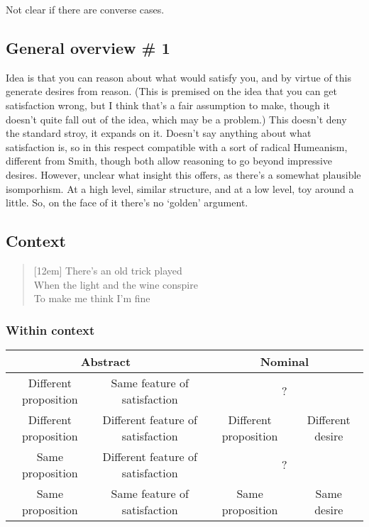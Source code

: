 \documentclass[10pt]{article}
\begin{document}
Not clear if there are converse cases.


\subsection{General overview \# 1}
\label{sec:general-overview-}


Idea is that you can reason about what would satisfy you, and by virtue of this generate desires from reason.
(This is premised on the idea that you can get satisfaction wrong, but I think that's a fair assumption to make, though it doesn't quite fall out of the idea, which may be a problem.)
This doesn't deny the standard stroy, it expands on it.
Doesn't say anything about what satisfaction is, so in this respect compatible with a sort of radical Humeanism, different from Smith, though both allow reasoning to go beyond impressive desires.
However, unclear what insight this offers, as there's a somewhat plausible isomporhism.
At a high level, similar structure, and at a low level, toy around a little.
So, on the face of it there's no `golden' argument.


\subsection{Context}
\label{sec:context}


\begin{verse}[12em]
    There's an old trick played \\
    When the light and the wine conspire \\
    To make me think I'm fine \\
  \end{verse}





\subsubsection{Within context}
\label{sec:within-context}

\begin{center}
  {\setlength{\tabcolsep}{0.5em}%
      \renewcommand{\arraystretch}{1.5}%
    \begin{tabular}[h]{cc|cc}
      \multicolumn{2}{c}{Abstract} & \multicolumn{2}{c}{Nominal} \\
      \hline
      Different proposition & Same feature of satisfaction & \multicolumn{2}{c}{?} \\
      Different proposition & Different feature of satisfaction & Different proposition & Different desire \\
      Same proposition & Different feature of satisfaction & \multicolumn{2}{c}{?} \\  %
      Same proposition & Same feature of satisfaction & Same proposition & Same desire \\
    \end{tabular}
}
\end{center}
\end{document}
